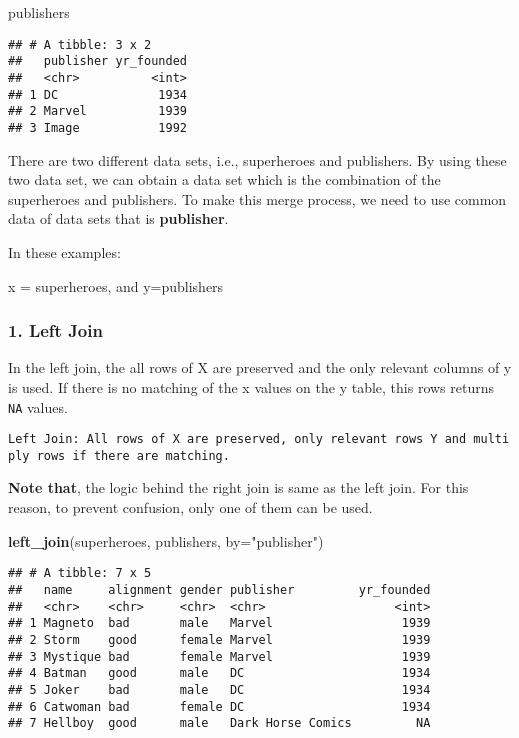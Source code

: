 \documentclass[
]{article}
\newenvironment{Shaded}{\begin{snugshade}}{\end{snugshade}}
\newcommand{\DataTypeTok}[1]{\textcolor[rgb]{0.13,0.29,0.53}{#1}}
\newcommand{\KeywordTok}[1]{\textcolor[rgb]{0.13,0.29,0.53}{\textbf{#1}}}
\newcommand{\NormalTok}[1]{#1}
\newcommand{\StringTok}[1]{\textcolor[rgb]{0.31,0.60,0.02}{#1}}
\begin{document}
\begin{Shaded}
\begin{Highlighting}[]
\NormalTok{publishers}
\end{Highlighting}
\end{Shaded}

\begin{verbatim}
## # A tibble: 3 x 2
##   publisher yr_founded
##   <chr>          <int>
## 1 DC              1934
## 2 Marvel          1939
## 3 Image           1992
\end{verbatim}

There are two different data sets, i.e., superheroes and publishers. By
using these two data set, we can obtain a data set which is the
combination of the superheroes and publishers. To make this merge
process, we need to use common data of data sets that is
\textbf{publisher}.

In these examples:

x = superheroes, and y=publishers

\hypertarget{left-join}{%
\subsubsection{1. Left Join}\label{left-join}}

In the left join, the all rows of X are preserved and the only relevant
columns of y is used. If there is no matching of the x values on the y
table, this rows returns \texttt{NA} values.

\texttt{Left\ Join:\ All\ rows\ of\ X\ are\ preserved,\ only\ relevant\ rows\ Y\ and\ multiply\ rows\ if\ there\ are\ matching.}

\textbf{Note that}, the logic behind the right join is same as the left
join. For this reason, to prevent confusion, only one of them can be
used.

\begin{Shaded}
\begin{Highlighting}[]
\KeywordTok{left\_join}\NormalTok{(superheroes, publishers, }\DataTypeTok{by=}\StringTok{"publisher"}\NormalTok{)}
\end{Highlighting}
\end{Shaded}

\begin{verbatim}
## # A tibble: 7 x 5
##   name     alignment gender publisher         yr_founded
##   <chr>    <chr>     <chr>  <chr>                  <int>
## 1 Magneto  bad       male   Marvel                  1939
## 2 Storm    good      female Marvel                  1939
## 3 Mystique bad       female Marvel                  1939
## 4 Batman   good      male   DC                      1934
## 5 Joker    bad       male   DC                      1934
## 6 Catwoman bad       female DC                      1934
## 7 Hellboy  good      male   Dark Horse Comics         NA
\end{verbatim}
\end{document}
